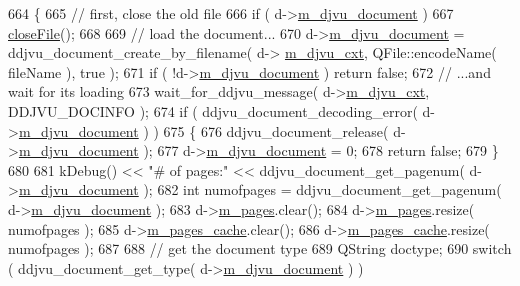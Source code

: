 \begin{DoxyCode}
664 \{
665     \textcolor{comment}{// first, close the old file}
666     \textcolor{keywordflow}{if} ( d->\hyperlink{classKDjVu_1_1Private_a183f9508738c71bb5abab150619a5ccd}{m\_djvu\_document} )
667         \hyperlink{classKDjVu_af9c1d642f5ef455739abadf09ed44586}{closeFile}();
668 
669     \textcolor{comment}{// load the document...}
670     d->\hyperlink{classKDjVu_1_1Private_a183f9508738c71bb5abab150619a5ccd}{m\_djvu\_document} = ddjvu\_document\_create\_by\_filename( d->
      \hyperlink{classKDjVu_1_1Private_a5a52150a7ab9bbd584d6d73d68ae9ba1}{m\_djvu\_cxt}, QFile::encodeName( fileName ), \textcolor{keyword}{true} );
671     \textcolor{keywordflow}{if} ( !d->\hyperlink{classKDjVu_1_1Private_a183f9508738c71bb5abab150619a5ccd}{m\_djvu\_document} ) \textcolor{keywordflow}{return} \textcolor{keyword}{false};
672     \textcolor{comment}{// ...and wait for its loading}
673     wait\_for\_ddjvu\_message( d->\hyperlink{classKDjVu_1_1Private_a5a52150a7ab9bbd584d6d73d68ae9ba1}{m\_djvu\_cxt}, DDJVU\_DOCINFO );
674     \textcolor{keywordflow}{if} ( ddjvu\_document\_decoding\_error( d->\hyperlink{classKDjVu_1_1Private_a183f9508738c71bb5abab150619a5ccd}{m\_djvu\_document} ) )
675     \{
676         ddjvu\_document\_release( d->\hyperlink{classKDjVu_1_1Private_a183f9508738c71bb5abab150619a5ccd}{m\_djvu\_document} );
677         d->\hyperlink{classKDjVu_1_1Private_a183f9508738c71bb5abab150619a5ccd}{m\_djvu\_document} = 0;
678         \textcolor{keywordflow}{return} \textcolor{keyword}{false};
679     \}
680 
681     kDebug() << \textcolor{stringliteral}{"# of pages:"} << ddjvu\_document\_get\_pagenum( d->\hyperlink{classKDjVu_1_1Private_a183f9508738c71bb5abab150619a5ccd}{m\_djvu\_document} );
682     \textcolor{keywordtype}{int} numofpages = ddjvu\_document\_get\_pagenum( d->\hyperlink{classKDjVu_1_1Private_a183f9508738c71bb5abab150619a5ccd}{m\_djvu\_document} );
683     d->\hyperlink{classKDjVu_1_1Private_a0c009b87dde95717ec9e9a8f701e6628}{m\_pages}.clear();
684     d->\hyperlink{classKDjVu_1_1Private_a0c009b87dde95717ec9e9a8f701e6628}{m\_pages}.resize( numofpages );
685     d->\hyperlink{classKDjVu_1_1Private_a7c2361a6591fe13e69bc7982a3efd780}{m\_pages\_cache}.clear();
686     d->\hyperlink{classKDjVu_1_1Private_a7c2361a6591fe13e69bc7982a3efd780}{m\_pages\_cache}.resize( numofpages );
687 
688     \textcolor{comment}{// get the document type}
689     QString doctype;
690     \textcolor{keywordflow}{switch} ( ddjvu\_document\_get\_type( d->\hyperlink{classKDjVu_1_1Private_a183f9508738c71bb5abab150619a5ccd}{m\_djvu\_document} ) )

\end{DoxyCode}
